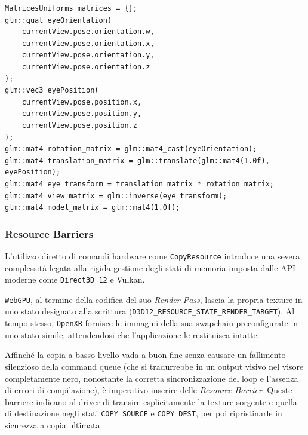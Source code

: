 \documentclass[a4paper, 11pt, twoside]{report}
\begin{document}
\begin{listing}[!ht]
\begin{verbatim}
MatricesUniforms matrices = {};
glm::quat eyeOrientation(
    currentView.pose.orientation.w,
    currentView.pose.orientation.x,
    currentView.pose.orientation.y,
    currentView.pose.orientation.z
);
glm::vec3 eyePosition(
    currentView.pose.position.x,
    currentView.pose.position.y,
    currentView.pose.position.z
);
glm::mat4 rotation_matrix = glm::mat4_cast(eyeOrientation);
glm::mat4 translation_matrix = glm::translate(glm::mat4(1.0f), eyePosition);
glm::mat4 eye_transform = translation_matrix * rotation_matrix;
glm::mat4 view_matrix = glm::inverse(eye_transform);
glm::mat4 model_matrix = glm::mat4(1.0f);
\end{verbatim}
\vspace{-0.75cm}
\caption{Costruzione dinamica della matrice di View tramite dati \texttt{\gls{OpenXR}}}
\label{listing:viewmatrix}
\end{listing}

\pagebreak

\subsubsection{Resource Barriers}

L'utilizzo diretto di comandi hardware come \texttt{CopyResource} introduce una severa complessità legata alla rigida
gestione degli stati di memoria imposta dalle API moderne come \texttt{Direct3D 12} e \gls{Vulkan}.

\texttt{WebGPU}, al termine della codifica del suo \textit{Render Pass}, lascia la propria texture in uno stato
designato alla scrittura (\texttt{D3D12\_RESOURCE\_STATE\_RENDER\_TARGET}). Al tempo stesso, \texttt{\gls{OpenXR}}
fornisce le immagini della sua swapchain preconfigurate in uno stato simile, attendendosi che l'applicazione le
restituisca intatte.

Affinché la copia a basso livello vada a buon fine senza causare un fallimento silenzioso della command queue (che si
tradurrebbe in un output visivo nel visore completamente nero, nonostante la corretta sincronizzazione del loop e
l'assenza di errori di compilazione), è imperativo inserire delle \textit{Resource Barrier}. Queste barriere indicano al
driver di transire esplicitamente la texture sorgente e quella di destinazione negli stati \texttt{COPY\_SOURCE} e
\texttt{COPY\_DEST}, per poi ripristinarle in sicurezza a copia ultimata.
\end{document}
